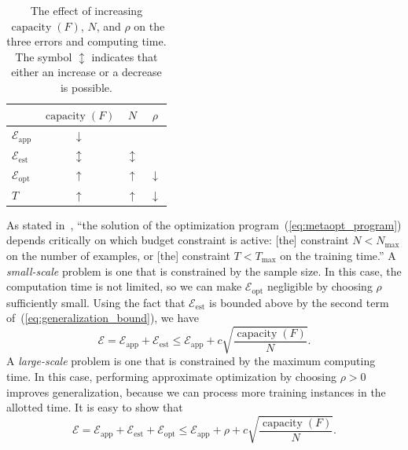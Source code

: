 \documentclass[11pt,a4paper]{article}
\numberwithin{equation}{section}
\newcommand{\capacity}{\operatorname{capacity}}
\newcommand{\apperr}{\mathcal{E}_{\mathrm{app}}}
\newcommand{\esterr}{\mathcal{E}_{\mathrm{est}}}
\newcommand{\opterr}{\mathcal{E}_{\mathrm{opt}}}
\begin{document}
\begin{table}
\centering
\begin{tabular}{lccc}
\toprule
& $\capacity(F)$ & $N$ & $\rho$ \\
\midrule
$\apperr$ & $\downarrow$ & \text{---} & \text{---} \\
$\esterr$ & $\updownarrow$ & $\updownarrow$ & \text{---} \\
$\opterr$ & $\uparrow$ & $\uparrow$ & $\downarrow$ \\
$T$ & $\uparrow$ & $\uparrow$ & $\downarrow$ \\
\bottomrule
\end{tabular}
\caption{The effect of increasing $\capacity(F)$, $N$, and $\rho$ on the three
errors and computing time. The symbol $\updownarrow$ indicates that either an
increase or a decrease is possible.\label{tab:metaopt_variables}}
\end{table}

As stated in~\citet{bousquet2008tradeoffs}, ``the solution of the optimization
program~(\ref{eq:metaopt_program}) depends critically on which budget constraint
is active: [the] constraint $N < N_{\text{max}}$ on the number of examples, or
[the] constraint $T < T_{\text{max}}$ on the training time.'' A
\emph{small-scale} problem is one that is constrained by the sample size. In
this case, the computation time is not limited, so we can make $\opterr$
negligible by choosing $\rho$ sufficiently small. Using the fact that $\esterr$
is bounded above by the second term of~(\ref{eq:generalization_bound}), we have
\begin{equation}
	\mathcal{E} = \apperr + \esterr \leq \apperr + c
		\sqrt{\frac{\capacity(F)}{N}}.
	\label{eq:small_scale_bound}
\end{equation}
A \emph{large-scale} problem is one that is constrained by the maximum computing
time. In this case, performing approximate optimization by choosing $\rho > 0$
improves generalization, because we can process more training instances in the
allotted time. It is easy to show that
\begin{equation}
	\mathcal{E}
	= \apperr + \esterr + \opterr
	\leq \apperr + \rho + c\sqrt{\frac{\capacity(F)}{N}}.
	\label{eq:large_scale_bound}
\end{equation}
\end{document}
